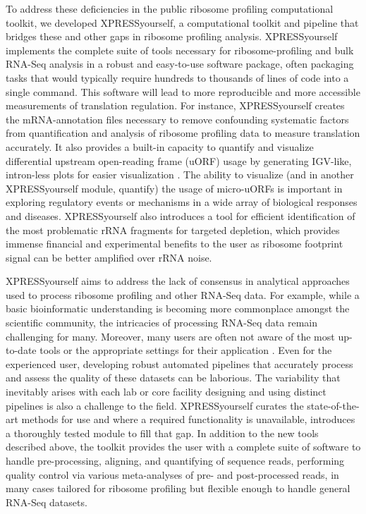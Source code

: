 \documentclass[10pt, oneside]{article}
\begin{document}
To address these deficiencies in the public ribosome profiling computational toolkit, we developed XPRESSyourself, a computational toolkit and pipeline that bridges these and other gaps in ribosome profiling analysis. XPRESSyourself implements the complete suite of tools necessary for ribosome-profiling and bulk RNA-Seq analysis in a robust and easy-to-use software package, often packaging tasks that would typically require hundreds to thousands of lines of code into a single command. This software will lead to more reproducible and more accessible measurements of translation regulation. For instance, XPRESSyourself creates the mRNA-annotation files necessary to remove confounding systematic factors from quantification and analysis of ribosome profiling data to measure translation accurately. It also provides a built-in capacity to quantify and visualize differential upstream open-reading frame (uORF) usage by generating IGV-like, intron-less plots for easier visualization \cite{igv}. The ability to visualize (and in another XPRESSyourself module, quantify) the usage of micro-uORFs is important in exploring regulatory events or mechanisms in a wide array of biological responses and diseases. XPRESSyourself also introduces a tool for efficient identification of the most problematic rRNA fragments for targeted depletion, which provides immense financial and experimental benefits to the user as ribosome footprint signal can be better amplified over rRNA noise. \par

XPRESSyourself aims to address the lack of consensus in analytical approaches used to process ribosome profiling and other RNA-Seq data. For example, while a basic bioinformatic understanding is becoming more commonplace amongst the scientific community, the intricacies of processing RNA-Seq data remain challenging for many. Moreover, many users are often not aware of the most up-to-date tools or the appropriate settings for their application \cite{costello_npjsba, funari_science}. Even for the experienced user, developing robust automated pipelines that accurately process and assess the quality of these datasets can be laborious. The variability that inevitably arises with each lab or core facility designing and using distinct pipelines is also a challenge to the field. XPRESSyourself curates the state-of-the-art methods for use and where a required functionality is unavailable, introduces a thoroughly tested module to fill that gap. In addition to the new tools described above, the toolkit provides the user with a complete suite of software to handle pre-processing, aligning, and quantifying of sequence reads, performing quality control via various meta-analyses of pre- and post-processed reads, in many cases tailored for ribosome profiling but flexible enough to handle general RNA-Seq datasets. \par
\end{document}
